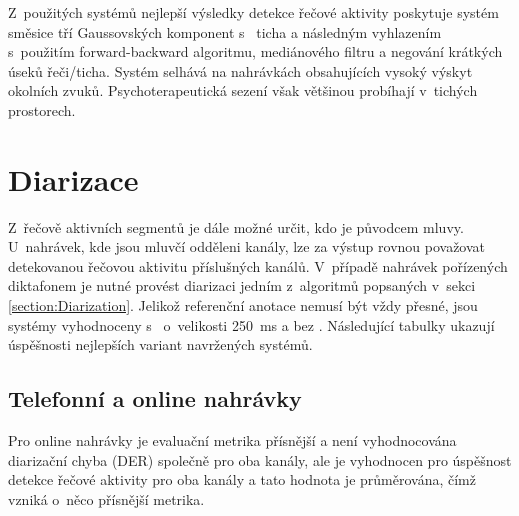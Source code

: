 Z~použitých systémů nejlepší výsledky detekce řečové aktivity poskytuje systém směsice tří Gaussovských komponent s~ ticha a následným vyhlazením s~použitím forward-backward algoritmu, mediánového filtru a negování krátkých úseků řeči/ticha. Systém selhává na nahrávkách obsahujících vysoký výskyt okolních zvuků. Psychoterapeutická sezení však většinou probíhají v~tichých prostorech.

\section{Diarizace}
\label{section:DIAR_testing}
Z~řečově aktivních segmentů je dále možné určit, kdo je původcem mluvy. U~nahrávek, kde jsou mluvčí odděleni kanály, lze za výstup rovnou považovat detekovanou řečovou aktivitu příslušných kanálů. V~případě nahrávek pořízených diktafonem je nutné provést diarizaci jedním z~algoritmů popsaných v~sekci \ref{section:Diarization}. Jelikož referenční anotace nemusí být vždy přesné, jsou systémy vyhodnoceny s~ o~velikosti 250~ms a bez . Následující tabulky ukazují úspěšnosti nejlepších variant navržených systémů.

\subsection{Telefonní a online nahrávky}
Pro online nahrávky je evaluační metrika přísnější a není vyhodnocována diarizační chyba (DER) společně pro oba kanály, ale je vyhodnocen pro úspěšnost detekce řečové aktivity pro oba kanály a tato hodnota je průměrována, čímž vzniká o~něco přísnější metrika.

